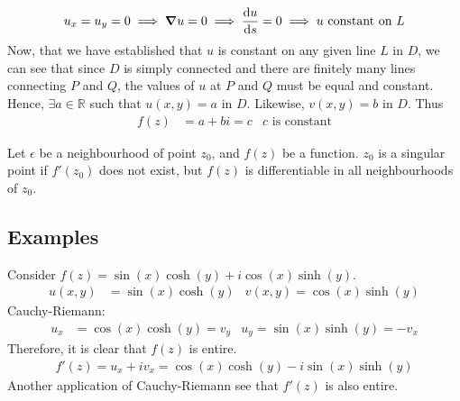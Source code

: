 \documentclass[12pt, english]{book}
\makeatletter
\renewenvironment{proof}[1][\proofname]{\par
	\pushQED{\qed}%
	\normalfont \topsep6\p@\@plus6\p@\relax
	\list{}{%
		\settowidth{\leftmargin}{\itshape\proofname:\hskip\labelsep}%
		\setlength{\labelwidth}{0pt}%
		\setlength{\itemindent}{-\leftmargin}%
	}%
	\item[\hskip\labelsep\itshape#1\@addpunct{:}]\ignorespaces
	}{ \popQED\endlist\@endpefalse}
\makeatother
\begin{document}
\begin{proof}
\begin{align*}
			u_x = u_y = 0 \implies \grad{u} = 0 \implies \dv{u}{s} = 0 
			\implies u \text{ constant on } L
		\end{align*}
		Now, that we have established that \(u\) is constant on any given line \(L\) in \(D\), we can see that since \(D\) is simply connected and there are finitely many lines connecting \(P\) and \(Q\), the values of \(u\) at \(P\) and \(Q\) must be equal and constant. Hence, \(\exists a \in \mathbb{R}\) such that \(u(x,y) = a \) in \(D\). Likewise, \(v(x,y) = b\) in \(D\). Thus
		\begin{align*}
			f(z) &= a + bi = c & c \text{ is constant}
		\end{align*}
	\end{proof}
	
	\begin{definition} 
		\label{Singular Point Definition - Complex}
		Let \(\epsilon\) be a neighbourhood of point \(z_0\), and \(f(z)\) be a function. \(z_0\) is a singular point if \(f'(z_0)\) does not exist, but \(f(z)\) is differentiable in all neighbourhoods of \(z_0\).
	\end{definition}
	
	\subsection{Examples} \label{Analytic Functions Examples Subsection - Complex}
	
	\begin{example}
		Consider \(f(z) = \sin(x)\cosh(y) + i\cos(x)\sinh(y) \).
		\begin{align*}
			u(x,y) &= \sin(x)\cosh(y)	& 	v(x,y) = \cos(x)\sinh(y)
		\end{align*}
		Cauchy-Riemann:
		\begin{align*}
			u_x &= \cos(x)\cosh(y) = v_y	&	u_y = \sin(x)\sinh(y) = -v_x
		\end{align*}
		Therefore, it is clear that \(f(z)\) is entire.
		\begin{align*}
			f'(z) = u_x + iv_x = \cos(x)\cosh(y) - i\sin(x)\sinh(y) 
		\end{align*}
		Another application of Cauchy-Riemann see that \(f'(z)\) is also entire.
	\end{example}
\end{document}
